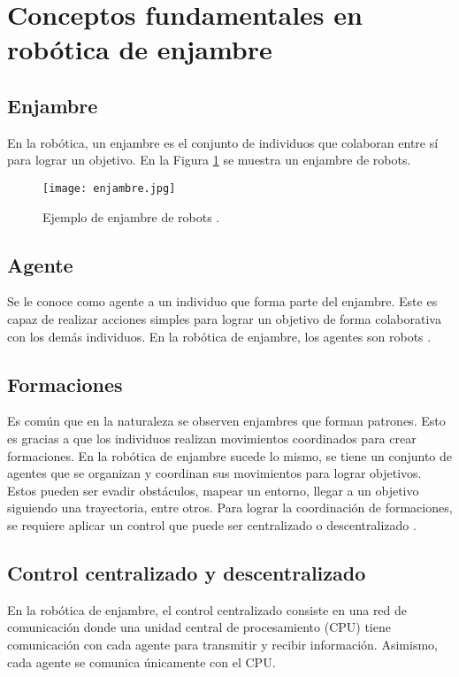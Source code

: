 \section{Conceptos fundamentales en robótica de enjambre}

\subsection{Enjambre}
En la robótica, un enjambre es el conjunto de individuos que colaboran entre sí para lograr un objetivo. En la Figura \ref{fig:enjambre} se muestra un enjambre de robots.

\begin{figure}[H]
	\centering
	\texttt{[image: enjambre.jpg]}
	\caption{Ejemplo de enjambre de robots \cite{imgEnjambre}.}
	\label{fig:enjambre}
\end{figure}

\subsection{Agente}
Se le conoce como agente a un individuo que forma parte del enjambre. Este es capaz de realizar acciones simples para lograr un objetivo de forma colaborativa con los demás individuos. En la robótica de enjambre, los agentes son robots \cite{definiciones_robotica_enjambre}.

\subsection{Formaciones}
Es común que en la naturaleza se observen enjambres que forman patrones. Esto es gracias a que los individuos realizan movimientos coordinados para crear formaciones. En la robótica de enjambre sucede lo mismo, se tiene un conjunto de agentes que se organizan y coordinan sus movimientos para lograr objetivos. Estos pueden ser evadir obstáculos, mapear un entorno, llegar a un objetivo siguiendo una trayectoria, entre otros. Para lograr la coordinación de formaciones, se requiere aplicar un control que puede ser centralizado o descentralizado \cite{definiciones_robotica_enjambre}.

\subsection{Control centralizado y descentralizado}
En la robótica de enjambre, el control centralizado consiste en una red de comunicación donde una unidad central de procesamiento (CPU) tiene comunicación con cada agente para transmitir y recibir información. Asimismo, cada agente se comunica únicamente con el CPU.


